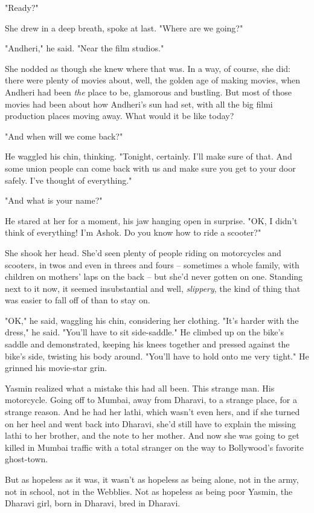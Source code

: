 "Ready?"

She drew in a deep breath, spoke at last. "Where are we going?"

"Andheri," he said. "Near the film studios."

She nodded as though she knew where that was. In a way, of course,
she did: there were plenty of movies about, well, the golden age of
making movies, when Andheri had been \emph{the} place to be,
glamorous and bustling. But most of those movies had been about how
Andheri's sun had set, with all the big filmi production places
moving away. What would it be like today?

"And when will we come back?"

He waggled his chin, thinking. "Tonight, certainly. I'll make sure
of that. And some union people can come back with us and make sure
you get to your door safely. I've thought of everything."

"And what is your name?"

He stared at her for a moment, his jaw hanging open in surprise.
"OK, I didn't think of everything! I'm Ashok. Do you know how to
ride a scooter?"

She shook her head. She'd seen plenty of people riding on
motorcycles and scooters, in twos and even in threes and fours --
sometimes a whole family, with children on mothers' laps on the
back -- but she'd never gotten on one. Standing next to it now, it
seemed insubstantial and well, \emph{slippery}, the kind of thing
that was easier to fall off of than to stay on.

"OK," he said, waggling his chin, considering her clothing. "It's
harder with the dress," he said. "You'll have to sit side-saddle."
He climbed up on the bike's saddle and demonstrated, keeping his
knees together and pressed against the bike's side, twisting his
body around. "You'll have to hold onto me very tight." He grinned
his movie-star grin.

Yasmin realized what a mistake this had all been. This strange man.
His motorcycle. Going off to Mumbai, away from Dharavi, to a
strange place, for a strange reason. And he had her lathi, which
wasn't even hers, and if she turned on her heel and went back into
Dharavi, she'd still have to explain the missing lathi to her
brother, and the note to her mother. And now she was going to get
killed in Mumbai traffic with a total stranger on the way to
Bollywood's favorite ghost-town.

But as hopeless as it was, it wasn't as hopeless as being alone,
not in the army, not in school, not in the Webblies. Not as
hopeless as being poor Yasmin, the Dharavi girl, born in Dharavi,
bred in Dharavi.

